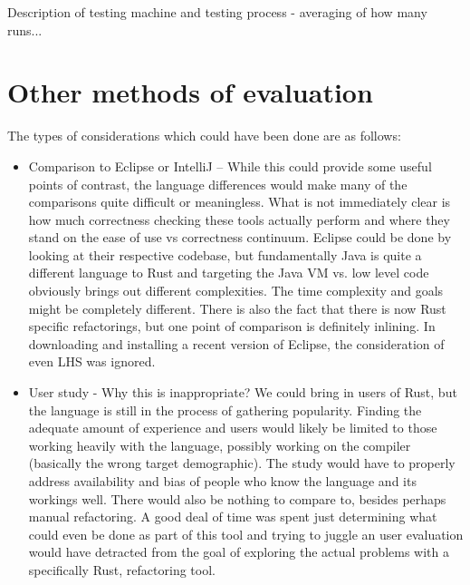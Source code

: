 Description of testing machine and testing process - averaging of how many runs... 


\section{Other methods of evaluation}
The types of considerations which could have been done are as follows:

\begin{itemize}

\item Comparison to Eclipse or IntelliJ -- While this could provide some useful points of contrast, the language differences would make many of the comparisons quite difficult or meaningless. What is not immediately clear is how much correctness checking these tools actually perform and where they stand on the ease of use vs correctness continuum. Eclipse could be done by looking at their respective codebase, but fundamentally Java is quite a different language to Rust and targeting the Java VM vs. low level code obviously brings out different complexities. The time complexity and goals might be completely different. There is also the fact that there is now Rust specific refactorings, but one point of comparison is definitely inlining. In downloading and installing a recent version of Eclipse, the consideration of even LHS was ignored.


\item User study - Why this is inappropriate? We could bring in users of Rust, but the language is still in the process of gathering popularity. Finding the adequate amount of experience and users would likely be limited to those working heavily with the language, possibly working on the compiler (basically the wrong target demographic). The study would have to properly address availability and bias of people who know the language and its workings well. There would also be nothing to compare to, besides perhaps manual refactoring. A good deal of time was spent just determining what could even be done as part of this tool and trying to juggle an user evaluation would have detracted from the goal of exploring the actual problems with a specifically Rust, refactoring tool. 

\end{itemize}

